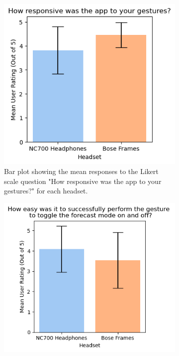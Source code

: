 \documentclass{l4proj}
\begin{document}
\begin{figure}[htb!] 
    \centering
    \begin{subfigure}[b]{0.6\textwidth}
        \includegraphics[width=\textwidth]{images/graphs/gesture_response_graph_small.png}
        \caption{Bar plot showing the mean responses to the Likert scale question "How responsive was the app to your gestures?" for each headset.}
        \label{fig:syn1}
    \end{subfigure}
    \begin{subfigure}[b]{0.6\textwidth}
        \includegraphics[width=\textwidth]{images/graphs/forecast_gesture_graph_small.png}

\end{subfigure}
\end{figure}
\end{document}

